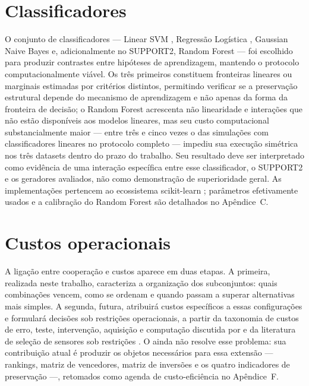 \section{Classificadores}

O conjunto de classificadores --- Linear SVM \cite{cortes1995}, Regressão Logística \cite{hosmer2013}, Gaussian Naive Bayes \cite{handyu2001} e, adicionalmente no SUPPORT2, Random Forest \cite{breiman2001} --- foi escolhido para produzir contrastes entre hipóteses de aprendizagem, mantendo o protocolo computacionalmente viável. Os três primeiros constituem fronteiras lineares ou marginais estimadas por critérios distintos, permitindo verificar se a preservação estrutural depende do mecanismo de aprendizagem e não apenas da forma da fronteira de decisão; o Random Forest acrescenta não linearidade e interações que não estão disponíveis aos modelos lineares, mas seu custo computacional substancialmente maior --- entre três e cinco vezes o das simulações com classificadores lineares no protocolo completo --- impediu sua execução simétrica nos três datasets dentro do prazo do trabalho. Seu resultado deve ser interpretado como evidência de uma interação específica entre esse classificador, o SUPPORT2 e os geradores avaliados, não como demonstração de superioridade geral. As implementações pertencem ao ecossistema scikit-learn \cite{pedregosa2011}; parâmetros efetivamente usados e a calibração do Random Forest são detalhados no Apêndice~C.

\section{Custos operacionais}

A ligação entre cooperação e custos aparece em duas etapas. A primeira, realizada neste trabalho, caracteriza a organização dos subconjuntos: quais combinações vencem, como se ordenam e quando passam a superar alternativas mais simples. A segunda, futura, atribuirá custos específicos a essas configurações e formulará decisões sob restrições operacionais, a partir da taxonomia de custos de erro, teste, intervenção, aquisição e computação discutida por \textcite{turney2002} e da literatura de seleção de sensores sob restrições \cite{joshi2009,krause2008}. O \CoInfoSim{} ainda não resolve esse problema: sua contribuição atual é produzir os objetos necessários para essa extensão --- rankings, matriz de vencedores, matriz de inversões e os quatro indicadores de preservação ---, retomados como agenda de custo-eficiência no Apêndice~F.
